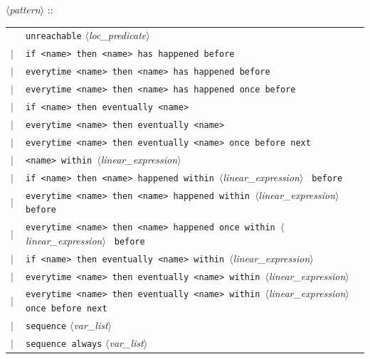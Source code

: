 \documentclass[a4paper,11pt]{report}
\newcommand{\nt}[1]{$\langle$\emph{#1}$\rangle$}
\newcommand{\regleGrammaire}[1]{\bigskip \noindent \nt{#1} :: \\}
\newcommand{\styleIMI}[1]{\textcolor{imicolor}{\texttt{#1}}}
\begin{document}
\regleGrammaire{pattern}
\begin{tabular}{l l}
	\  & \styleIMI{unreachable} \nt{loc\_predicate} \\
	$|$ & \styleIMI{if <name> then <name> has happened before} \\
	$|$ & \styleIMI{everytime <name> then <name> has happened before} \\
	$|$ & \styleIMI{everytime <name> then <name> has happened once before} \\
	$|$ & \styleIMI{if <name> then eventually <name>} \\
	$|$ & \styleIMI{everytime <name> then eventually <name>} \\
	$|$ & \styleIMI{everytime <name> then eventually <name> once before next} \\
	$|$ & \styleIMI{<name> within }\nt{linear\_expression} \styleIMI{} \\
	$|$ & \styleIMI{if <name> then <name> happened within }\nt{linear\_expression} \styleIMI{ before} \\
	$|$ & \styleIMI{everytime <name> then <name> happened within }\nt{linear\_expression} \styleIMI{ before} \\
	$|$ & \styleIMI{everytime <name> then <name> happened once within }\nt{linear\_expression} \styleIMI{ before} \\
	$|$ & \styleIMI{if <name> then eventually <name> within }\nt{linear\_expression} \styleIMI{} \\
	$|$ & \styleIMI{everytime <name> then eventually <name> within }\nt{linear\_expression} \styleIMI{} \\
	$|$ & \styleIMI{everytime <name> then eventually <name> within }\nt{linear\_expression} \styleIMI{ once before next} \\
	$|$ & \styleIMI{sequence} \nt{var\_list} \\
	$|$ & \styleIMI{sequence always} \nt{var\_list} \\
\end{tabular}



\end{document}
